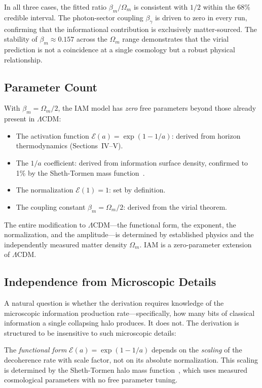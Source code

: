\documentclass[aps,prd,twocolumn,superscriptaddress,nofootinbib]{revtex4-2}
\begin{document}
In all three cases, the fitted ratio $\beta_m/\Omega_m$ is consistent with $1/2$ within the 68\% credible interval. The photon-sector coupling $\beta_\gamma$ is driven to zero in every run, confirming that the informational contribution is exclusively matter-sourced. The stability of $\beta_m \approx 0.157$ across the $\Omega_m$ range demonstrates that the virial prediction is not a coincidence at a single cosmology but a robust physical relationship.

\subsection{Parameter Count}

With $\beta_m = \Omega_m/2$, the IAM model has \textit{zero} free parameters beyond those already present in $\Lambda$CDM:
\begin{itemize}
\item The activation function $\mathcal{E}(a) = \exp(1-1/a)$: derived from horizon thermodynamics (Sections~IV--V).
\item The $1/a$ coefficient: derived from information surface density, confirmed to 1\% by the Sheth-Tormen mass function~\cite{Mahaffey2026holographic}.
\item The normalization $\mathcal{E}(1) = 1$: set by definition.
\item The coupling constant $\beta_m = \Omega_m/2$: derived from the virial theorem.
\end{itemize}

The entire modification to $\Lambda$CDM---the functional form, the exponent, the normalization, and the amplitude---is determined by established physics and the independently measured matter density $\Omega_m$. IAM is a zero-parameter extension of $\Lambda$CDM.

\subsection{Independence from Microscopic Details}

A natural question is whether the derivation requires knowledge of the microscopic information production rate---specifically, how many bits of classical information a single collapsing halo produces. It does not. The derivation is structured to be insensitive to such microscopic details:

The \textit{functional form} $\mathcal{E}(a) = \exp(1-1/a)$ depends on the \textit{scaling} of the decoherence rate with scale factor, not on its absolute normalization. This scaling is determined by the Sheth-Tormen halo mass function~\cite{Sheth1999}, which uses measured cosmological parameters with no free parameter tuning.
\end{document}
